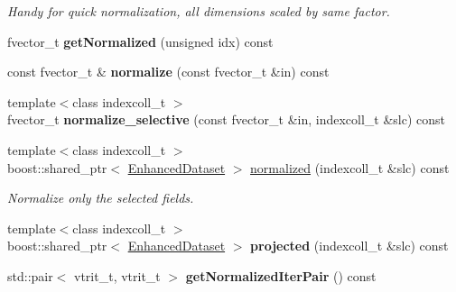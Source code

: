 \begin{DoxyCompactItemize}
\begin{DoxyCompactList}\small\item\em Handy for quick normalization, all dimensions scaled by same factor. \item\end{DoxyCompactList}\item 
\hypertarget{classCDA_1_1EnhancedDataset_af3fa7167971e2ac2eda248c849de722d}{
fvector\_\-t {\bfseries getNormalized} (unsigned idx) const }
\label{classCDA_1_1EnhancedDataset_af3fa7167971e2ac2eda248c849de722d}

\item 
\hypertarget{classCDA_1_1EnhancedDataset_a6e5b4a6f8a8a220aed9fbc6c834e0b38}{
const fvector\_\-t \& {\bfseries normalize} (const fvector\_\-t \&in) const }
\label{classCDA_1_1EnhancedDataset_a6e5b4a6f8a8a220aed9fbc6c834e0b38}

\item 
\hypertarget{classCDA_1_1EnhancedDataset_a781f6fe7714713bb70ad6a50b9b08731}{
{\footnotesize template$<$class indexcoll\_\-t $>$ }\\fvector\_\-t {\bfseries normalize\_\-selective} (const fvector\_\-t \&in, indexcoll\_\-t \&slc) const }
\label{classCDA_1_1EnhancedDataset_a781f6fe7714713bb70ad6a50b9b08731}

\item 
\hypertarget{classCDA_1_1EnhancedDataset_a683ee6b03fc4ce6766d45cb05d5cb855}{
{\footnotesize template$<$class indexcoll\_\-t $>$ }\\boost::shared\_\-ptr$<$ \hyperlink{classCDA_1_1EnhancedDataset}{EnhancedDataset} $>$ \hyperlink{classCDA_1_1EnhancedDataset_a683ee6b03fc4ce6766d45cb05d5cb855}{normalized} (indexcoll\_\-t \&slc) const }
\label{classCDA_1_1EnhancedDataset_a683ee6b03fc4ce6766d45cb05d5cb855}

\begin{DoxyCompactList}\small\item\em Normalize only the selected fields. \item\end{DoxyCompactList}\item 
\hypertarget{classCDA_1_1EnhancedDataset_a6159b71320f3e076639b72d202817c30}{
{\footnotesize template$<$class indexcoll\_\-t $>$ }\\boost::shared\_\-ptr$<$ \hyperlink{classCDA_1_1EnhancedDataset}{EnhancedDataset} $>$ {\bfseries projected} (indexcoll\_\-t \&slc) const }
\label{classCDA_1_1EnhancedDataset_a6159b71320f3e076639b72d202817c30}

\item 
\hypertarget{classCDA_1_1EnhancedDataset_a27f451c43eb9ca54b10b2463047af559}{
std::pair$<$ vtrit\_\-t, vtrit\_\-t $>$ {\bfseries getNormalizedIterPair} () const }
\label{classCDA_1_1EnhancedDataset_a27f451c43eb9ca54b10b2463047af559}


\end{DoxyCompactItemize}
